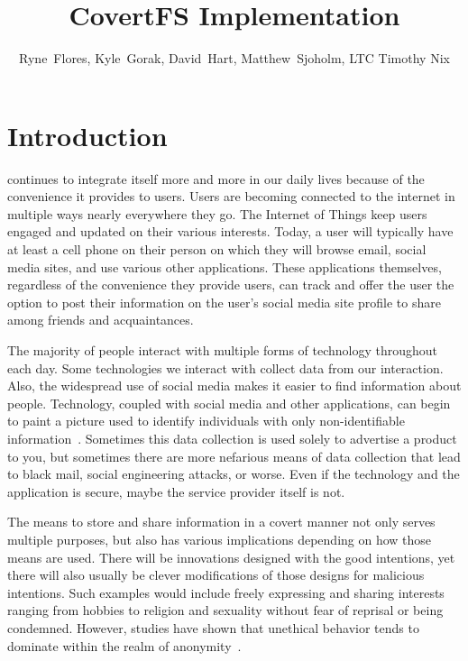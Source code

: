 \documentclass[12pt,journal,compsoc]{IEEEtran}
\title{CovertFS Implementation}
\author{Ryne~Flores, Kyle~Gorak, David~Hart, Matthew~Sjoholm, LTC Timothy Nix \\ \IEEEmembership{Department of Electrical Engineering and Computer Science\\ United States Military Academy}}
\date{}
\begin{document}
\maketitle

\section{Introduction}


 continues to integrate itself more and more in our daily lives because of the convenience it provides to users. Users are becoming connected to the internet in multiple ways nearly everywhere they go. The Internet of Things keep users engaged and updated on their various interests. Today, a user will typically have at least a cell phone on their person on which they will browse email, social media sites, and use various other applications. These applications themselves, regardless of the convenience they provide users, can track and offer the user the option to post their information on the user's social media site profile to share among friends and acquaintances.

The majority of people interact with multiple forms of technology throughout each day. Some technologies we interact with collect data from our interaction. Also, the widespread use of social media makes it easier to find information about people. Technology, coupled with social media and other applications, can begin to paint a picture used to identify individuals with only non-identifiable information~\cite{VanDam2015}. Sometimes this data collection is used solely to advertise a product to you, but sometimes there are more nefarious means of data collection that lead to black mail, social engineering attacks, or worse. Even if the technology and the application is secure, maybe the service provider itself is not\cite{Baliga2007}.

The means to store and share information in a covert manner not only serves multiple purposes, but also has various implications depending on how those means are used. There will be innovations designed with the good intentions, yet there will also usually be clever modifications of those designs for malicious intentions. Such examples would include freely expressing and sharing interests ranging from hobbies to religion and sexuality without fear of reprisal or being condemned. However, studies have shown that unethical behavior tends to dominate within the realm of anonymity~\cite{Guitton2013}.
\end{document}
